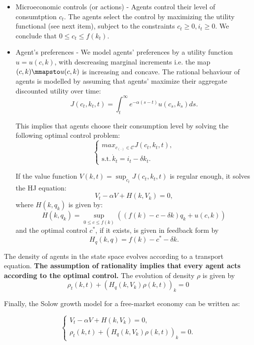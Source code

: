 \documentclass{article}
\begin{document}
\begin{itemize}
    \item Microeconomic controls (or actions) - Agents control their level of consumtption $c_t$.
    The agents select the control by maximizing the utility functional (see next item), subject to the 
    constraints $c_t \geq 0, i_t \geq 0$. We conclude that $0\leq c_t \leq f(k_t)$.
    \item Agent's preferences - We model agents' preferences by a utility function $u = u(c,k)$, with descreasing
    marginal increments i.e. the map $(c,k) \mmapsto u(c,k)$ is increasing and concave. The rational 
    behaviour of agents is modelled by assuming that agents' maximize 
    their aggregate discounted utility over time:
    $$
    J(c_t, k_t, t) = \int_t^\infty e^{-\alpha (s - t)} u(c_s, k_s) ds.
    $$

    This implies that agents choose their consumption level by solving the following optimal control
    problem:
    \begin{equation}
        \begin{cases}
            max_{c_{(\cdot)} \in \mathcal{C}} J(c_t, k_t, t),\\
            \text{s.t.} \, \dot k_t = i_t - \delta k_t.
        \end{cases}
    \end{equation}

    If the value function $V(k,t) = \sup_{c_t} J(c_t, k_t, t)$ is regular enough, it solves the HJ equation:
    $$
    V_t - \alpha V + H(k,V_k) = 0,
    $$
    where $H(k, q_k)$ is given by:
    $$
    H(k, q_k ) = \sup_{0 \leq c \leq f(k)} ((f(k) - c - \delta k) q_k + u(c,k))
    $$
    and the optimal control $c^*$, if it exists, is given in feedback form by
    $$
    H_q(k,q) = f(k) - c^* - \delta k.
    $$
\end{itemize}

The density of agents in the state space evolves according to a transport equation. 
{\bf The assumption of rationality implies that every agent acts according to the optimal control.}
The evolution of density $\rho$ is given by 
$$
\rho_t(k,t) + (H_q(k,V_k) \rho(k,t))_k = 0
$$

Finally, the Solow growth model for a free-market economy can be written as:

\begin{equation}
    \begin{cases}
        V_t - \alpha V + H(k,V_k) = 0,\\
        \rho_t(k,t) + (H_q (k,V_k) \rho(k,t))_k = 0.
    \end{cases}
\end{equation}
\end{document}
